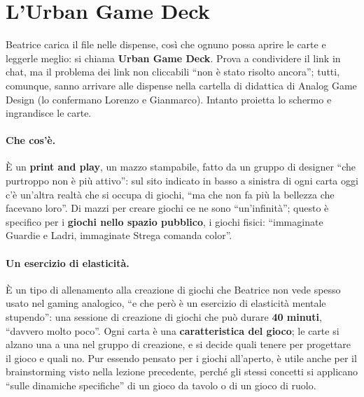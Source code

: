 \section{L'Urban Game Deck}
\label{a9:sec:urban}



Beatrice carica il file nelle dispense, così che ognuno possa aprire le carte e
leggerle meglio: si chiama \textbf{Urban Game Deck}. Prova a condividere il link in
chat, ma il problema dei link non cliccabili ``non è stato risolto ancora''; tutti,
comunque, sanno arrivare alle dispense nella cartella di didattica di Analog Game
Design (lo confermano Lorenzo e Gianmarco). Intanto proietta lo schermo e ingrandisce
le carte.

\paragraph{Che cos'è.} È un \textbf{print and play}, un mazzo stampabile, fatto da un
gruppo di designer ``che purtroppo non è più attivo'': sul sito indicato in basso a
sinistra di ogni carta oggi c'è un'altra realtà che si occupa di giochi, ``ma che non
fa più la bellezza che facevano loro''. Di mazzi per creare giochi ce ne sono
``un'infinità''; questo è specifico per i \textbf{giochi nello spazio pubblico}, i
giochi fisici: ``immaginate Guardie e Ladri, immaginate Strega comanda color''.

\paragraph{Un esercizio di elasticità.} È un tipo di allenamento alla creazione di
giochi che Beatrice non vede spesso usato nel gaming analogico, ``e che però è un
esercizio di elasticità mentale stupendo'': una sessione di creazione di giochi che può
durare \textbf{40 minuti}, ``davvero molto poco''. Ogni carta è una
\textbf{caratteristica del gioco}; le carte si alzano una a una nel gruppo di
creazione, e si decide quali tenere per progettare il gioco e quali no. Pur essendo
pensato per i giochi all'aperto, è utile anche per il brainstorming visto nella
lezione precedente, perché gli stessi concetti si applicano ``sulle dinamiche
specifiche'' di un gioco da tavolo o di un gioco di ruolo.

